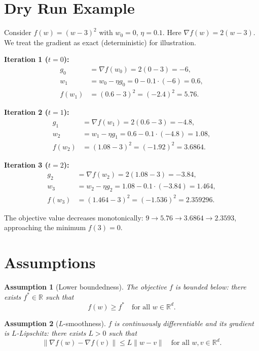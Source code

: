 \documentclass{article}
\newtheorem{assumption}{Assumption}
\begin{document}
\section*{Dry Run Example}

Consider $f(w) = (w-3)^2$ with $w_0 = 0$, $\eta = 0.1$. Here $\nabla f(w) = 2(w-3)$.
We treat the gradient as exact (deterministic) for illustration.

\textbf{Iteration 1 ($t=0$):}
\begin{align*}
g_0 &= \nabla f(w_0) = 2(0-3) = -6, \\
w_1 &= w_0 - \eta g_0 = 0 - 0.1 \cdot (-6) = 0.6, \\
f(w_1) &= (0.6 - 3)^2 = (-2.4)^2 = 5.76.
\end{align*}

\textbf{Iteration 2 ($t=1$):}
\begin{align*}
g_1 &= \nabla f(w_1) = 2(0.6-3) = -4.8, \\
w_2 &= w_1 - \eta g_1 = 0.6 - 0.1 \cdot (-4.8) = 1.08, \\
f(w_2) &= (1.08 - 3)^2 = (-1.92)^2 = 3.6864.
\end{align*}

\textbf{Iteration 3 ($t=2$):}
\begin{align*}
g_2 &= \nabla f(w_2) = 2(1.08-3) = -3.84, \\
w_3 &= w_2 - \eta g_2 = 1.08 - 0.1 \cdot (-3.84) = 1.464, \\
f(w_3) &= (1.464 - 3)^2 = (-1.536)^2 = 2.359296.
\end{align*}

The objective value decreases monotonically: $9 \to 5.76 \to 3.6864 \to 2.3593$, approaching the minimum $f(3)=0$.

\section*{Assumptions}

\begin{assumption}[Lower boundedness]\label{ass:lb}
The objective $f$ is bounded below: there exists $f^* \in \mathbb{R}$ such that
\[
f(w) \geq f^* \quad \text{for all } w \in \mathbb{R}^d.
\]
\end{assumption}

\begin{assumption}[$L$-smoothness]\label{ass:smooth}
$f$ is continuously differentiable and its gradient is $L$-Lipschitz: there exists $L > 0$ such that
\[
\|\nabla f(w) - \nabla f(v)\| \leq L \|w - v\| \quad \text{for all } w, v \in \mathbb{R}^d.
\]
\end{assumption}
\end{document}
